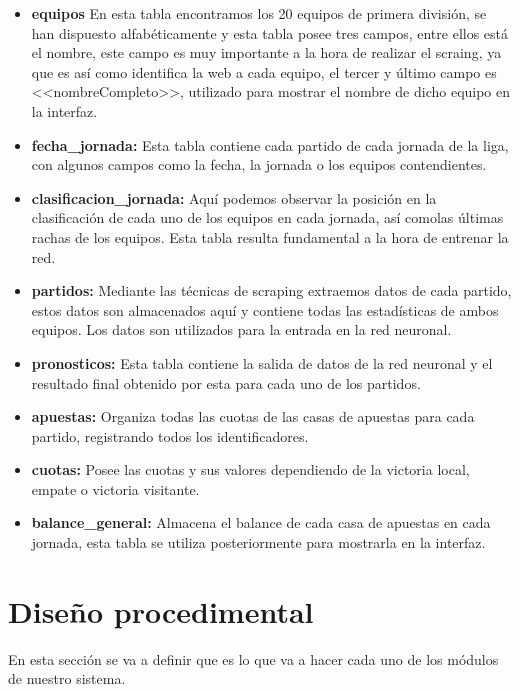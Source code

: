 \begin{itemize}
\item \textbf{equipos} En esta tabla encontramos los 20 equipos de primera división, se han dispuesto alfabéticamente y esta tabla posee tres campos, entre ellos está el nombre, este campo es muy importante a la hora de realizar el scraing, ya que es así como identifica la web a cada equipo, el tercer y último campo es <<nombreCompleto>>, utilizado para mostrar el nombre de dicho equipo en la interfaz.

\item \textbf{fecha\_jornada: }Esta tabla contiene cada partido de cada jornada de la liga, con algunos campos como la fecha, la jornada o los equipos contendientes.

\item \textbf{clasificacion\_jornada: }Aquí podemos observar la posición en la clasificación de cada uno de los equipos en cada jornada, así comolas últimas rachas de los equipos. Esta tabla resulta fundamental a la hora de entrenar la red.

\item \textbf{partidos: }Mediante las técnicas de scraping extraemos datos de cada partido, estos datos son almacenados aquí y contiene todas las estadísticas de ambos equipos. Los datos son utilizados para la entrada en la red neuronal.

\item \textbf{pronosticos: }Esta tabla contiene la salida de datos de la red neuronal y el resultado final obtenido por esta para cada uno de los partidos.

\item \textbf{apuestas: }Organiza todas las cuotas de las casas de apuestas para cada partido, registrando todos los identificadores.

\item \textbf{cuotas: }Posee las cuotas y sus valores dependiendo de la victoria local, empate o victoria visitante.

\item \textbf{balance\_general: }Almacena el balance de cada casa de apuestas en cada jornada, esta tabla se utiliza posteriormente para mostrarla en la interfaz.
\end{itemize}
\section{Diseño procedimental}
En esta sección se va a definir que es lo que va a hacer cada uno de los módulos de nuestro sistema.

